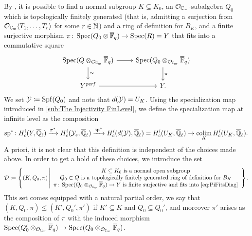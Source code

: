 \documentclass[../main.tex]{subfiles}
\begin{document}
By \cite[Lemma 3.16]{mieda2016geometric}, it is possible to find a normal
subgroup $K \subseteq K_0$,
an $\cO_\Cp$-subalgebra $Q_0$ which is topologically finitely generated (that is,
admitting a surjection from $\cO_\Cp \langle T_1, \dots, T_r \rangle$ for some $r
\in \mathbb{N}$) and a ring of definition for $B_K$, and a finite surjective
morphism $\pi\colon \operatorname{Spec}(Q_0 \otimes {\overline{\mathbb{F}}_q}) \to \operatorname{Spec}(R) = Y$ that fits into
a commutative square
\begin{equation}\label{eq:PiFitsDiag}
\begin{tikzcd}[ampersand replacement=\&]
  {\spec(Q \otimes_{\cO_\Cp} \Fqbar)} \& {\spec(Q_0 \otimes_{\cO_\Cp}\Fqbar)} \\
	{Y^\perf} \& {Y.}
	\arrow[from=1-1, to=1-2]
	\arrow["\sim", from=1-1, to=2-1]
	\arrow["\pi", from=1-2, to=2-2]
	\arrow[from=2-1, to=2-2]
\end{tikzcd}
\end{equation}
We set $\mathcal{Y} \coloneqq \operatorname{Spf}(Q_0)$ and note that $d(\mathcal{Y}) = U_K$. Using the
specialization map introduced in \cref{sub:The Injectivity FinLevel}, we define
the specialization map at infinite level as the composition
\begin{equation} \label{eq:DefSpecMapAtInfLevel}
  \mathrm{sp}^*\colon H^i_c(Y, {\overline {\mathbb{Q}}_\ell}) \xrightarrow{\pi^*} H^i_c(\mathcal{Y}_s, {\overline {\mathbb{Q}}_\ell}) 
  \xrightarrow{\mathrm{sp}^*} H^i_c(d(\mathcal{Y}), {\overline {\mathbb{Q}}_\ell}) = H^i_c(U_K, {\overline {\mathbb{Q}}_\ell})
  \to \operatorname*{colim}_K H^i_c(U_K, {\overline {\mathbb{Q}}_\ell}).
\end{equation}
A priori, it is not clear that this definition is independent of the choices made 
above. In order to get a hold of these choices, we introduce the set
\begin{equation*}
  \cD \coloneqq \left\{ (K, Q_0, \pi) \, \middle \vert \begin{array}c
      K \subseteq K_0 \text{ is a normal open subgroup} \\
      Q_0 \subset Q \text{ is a topologically finitely generated ring of definition 
      for $B_K$} \\
      \pi\colon \spec(Q_0 \otimes_{\cO_\Cp} \Fqbar) \to Y \text{ is finite
        surjective and fits into \eqref{eq:PiFitsDiag}}
  \end{array}\right\}.
\end{equation*}
This set comes equipped with a natural partial order, we say that 
$(K, Q_0, \pi) \leq (K', Q_0', \pi')$ if $K' \subseteq K$ and $Q_0 \subseteq Q_0'$,
and moreover $\pi'$ arises as the composition of $\pi$ with the induced morphism 
$\spec(Q_0' \otimes_{\cO_\Cp} \Fqbar) \to \spec(Q_0 \otimes_{\cO_\Cp} \Fqbar)$. 
\end{document}
